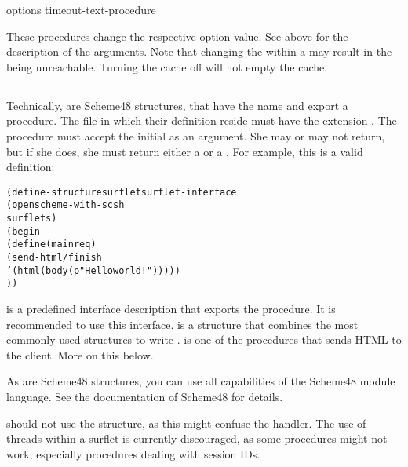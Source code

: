        {options timeout-text-procedure} {\undefined}
\begin{desc}
  These procedures change the respective option value.  See above for
  the description of the arguments.  Note that changing the
   within a \surflet may result in the \surflets
  being unreachable.  Turning the cache off will not empty the
  \surflet cache.
\end{desc}


\subsection{\surflets}

Technically, \surflets are Scheme48 structures, that have the name
 and export a  procedure.  The file in which their
definition reside must have the extension .  The 
procedure must accept the initial  as an argument.
She may or may not return, but if she does, she must return either a
 or a .  For example, this
is a valid \surflet definition:

\begin{alltt}
(define-structure surflet surflet-interface
  (open scheme-with-scsh
        surflets)
  (begin
    (define (main req)
       (send-html/finish
         '(html (body (p "Hello world!")))))
))
\end{alltt}

 is a predefined interface description that
exports the  procedure.  It is recommended to use this
interface.   is a structure that combines the most
commonly used structures to write \surflets.   is
one of the procedures that sends HTML to the client.  More on this
below.

As \surflets are Scheme48 structures, you can use all capabilities of
the Scheme48 module language.  See the documentation of Scheme48 for
details.

\surflets should not use the  structure, as this might
confuse the \surflet handler.  The use of threads within a surflet is
currently discouraged, as some procedures might not work, especially
procedures dealing with session IDs.

